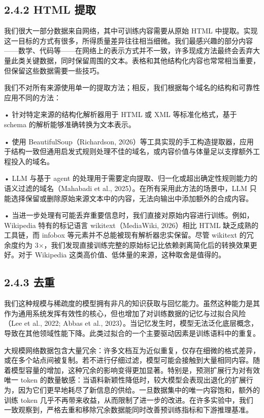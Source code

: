 \subsection{2.4.2 HTML 提取}\label{html-extraction}

我们很大一部分数据来自网络，其中可训练内容需要从原始 HTML 中提取。实现这一目标的方式有很多，所得质量差异往往相当细微。我们最感兴趣的部分内容——数学、代码等——在网络上的表示方式并不一致，许多现成方法最终会丢弃大量此类关键数据，同时保留周围的文本。表格和其他结构化内容也常常相当重要，但保留这些数据需要一些技巧。

我们不对所有来源使用单一的提取方法；相反，我们根据每个域名的结构和可靠性应用不同的方法：

• 针对特定来源的结构化解析器用于 HTML 或 XML 等标准化格式，基于 schema 的解析能够准确转换为文本表示。

• 使用 BeautifulSoup（Richardson, 2026）等工具实现的手工构造提取器，应用于结构一致但通用启发式规则处理不佳的域名，或内容价值与体量足以支撑额外工程投入的域名。

• LLM 与基于 agent 的处理用于需要定向提取、归一化或超出确定性规则能力的语义过滤的域名（Mahabadi et al., 2025）。在所有采用此方法的场景中，LLM 只能选择保留或删除原始来源文本中的内容，无法向输出中添加额外的合成内容。



• 当进一步处理有可能丢弃重要信息时，我们直接对原始内容进行训练。例如，Wikipedia 特有的标记语言 wikitext（MediaWiki, 2026）相比 HTML 缺乏成熟的工具链，而 infobox 等元素并不总能被现有解析器忠实保留。尽管 wikitext 的冗余度约为 3$\times$，我们发现直接训练完整的原始标记比依赖剥离简化后的转换效果更好。对于 Wikipedia 这类高价值、低体量的来源，这种取舍是值得的。

\subsection{2.4.3 去重}\label{deduplication}

我们这种规模与稀疏度的模型拥有非凡的知识获取与回忆能力。虽然这种能力是其作为通用系统发挥有效性的核心，但也增加了对训练数据的记忆与过拟合风险（Lee et al., 2022; Abbas et al., 2023）。当记忆发生时，模型无法泛化底层概念，导致在其他领域性能下降。此类过拟合的一个主要驱动因素是训练语料中的重复。

大规模网络数据包含大量冗余：许多文档互为近似重复，仅存在细微的格式差异，或在多个站点间被复制。若不进行仔细过滤，模型可能会接触到大量相同内容。随着模型容量的增加，这种冗余的影响变得更加显著。特别是，预测扩展行为对有效唯一 token 的数量敏感：当语料新颖性降低时，较大模型会表现出退化的扩展行为，因为它们更早地耗尽了新信息的供给。一旦数据集中的唯一内容饱和，额外的训练 token 几乎不再带来收益，从而限制了进一步的改进。在许多实验中，我们一致观察到，严格去重和移除冗余数据能同时改善预训练指标和下游推理基准。

